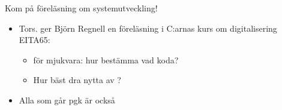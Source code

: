 

\ifkompendium\else
\begin{SlideExtra}{Kom på föreläsning om systemutveckling!}
\begin{itemize}
  \item Tors.  ger Björn Regnell en föreläsning i C:arnas kurs om digitalisering EITA65: 
\begin{itemize}
  \item {} för mjukvara: hur bestämma vad koda?
  \item Hur bäst dra nytta av ?
\end{itemize}
  \item Alla  som går pgk är också \\
\end{itemize}
  
\end{SlideExtra}
\fi 


